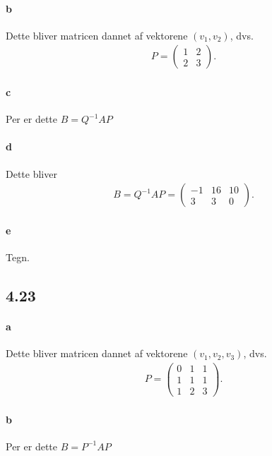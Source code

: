 			\paragraph{b} Dette bliver matricen dannet af vektorene $(v_1,v_2)$, dvs.
				\begin{align*}
					P=\left(\begin{array}{rr} 1 & 2 \\ 2 & 3 \end{array}\right).
				\end{align*}

			\paragraph{c} Per \cite[Sætning 4.4.14]{hesselholt2017} er dette $B=Q^{-1}AP$

			\paragraph{d} Dette bliver
				\begin{align*}
					B = Q^{-1}AP = \left(\begin{array}{rrr} {-1} & {16} & {10} \\ {3} & {3} & {0} \end{array}\right).
				\end{align*} 

			\paragraph{e} Tegn.

		\subsection{4.23}

			\paragraph{a} Dette bliver matricen dannet af vektorene $(v_1,v_2,v_3)$, dvs.
			    \begin{align*}
					P=\left(\begin{array}{rrr} 0 & 1 & 1 \\ 1 & 1 & 1 \\ 1 & 2 & 3 \end{array}\right).
				\end{align*}

			\paragraph{b} Per \cite[Sætning 4.4.14]{hesselholt2017} er dette $B=P^{-1}AP$

